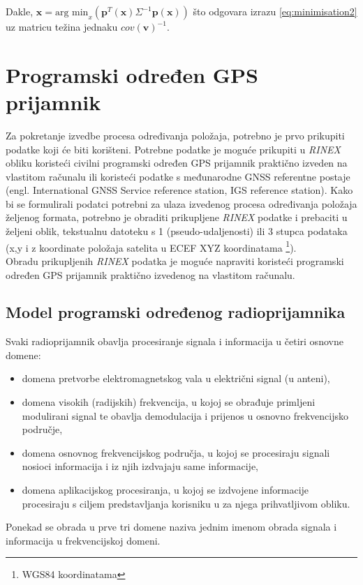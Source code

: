 \documentclass[a4paper,twoside,12pt]{memoir} %
\begin{document}
Dakle, $\hat{\mathbf{x}} = \text{arg min}_x \left( \mathbf{p}^T (\mathbf{x}) \Sigma^{-1}\mathbf{p} (\mathbf{x}) \right)$ 
što odgovara izrazu \ref{eq:minimisation2} uz matricu težina jednaku $cov(\mathbf{v})^{-1}$.

\chapter{Programski određen GPS prijamnik}
Za pokretanje izvedbe procesa određivanja položaja, potrebno je prvo prikupiti podatke koji će biti korišteni. Potrebne podatke je moguće prikupiti u \textit{RINEX} obliku 
koristeći civilni programski određen GPS prijamnik praktično izveden na vlastitom računalu ili 
koristeći podatke s međunarodne GNSS referentne postaje (engl. International GNSS Service reference station, IGS reference station).
Kako bi se formulirali podatci potrebni za ulaza izvedenog procesa određivanja položaja
željenog formata, potrebno je obraditi prikupljene \textit{RINEX} podatke i prebaciti u željeni oblik, tekstualnu datoteku s 1 (pseudo-udaljenosti) ili 3 stupca podataka (x,y i z koordinate položaja satelita u ECEF XYZ koordinatama \footnote{WGS84 koordinatama}).\\
Obradu prikupljenih \textit{RINEX} podatka je moguće napraviti koristeći
programski određen GPS prijamnik praktično izvedenog na vlastitom računalu.

\section{Model programski određenog radioprijamnika}
Svaki radioprijamnik obavlja procesiranje signala i informacija u četiri osnovne domene:
\begin{itemize}
	\item domena pretvorbe elektromagnetskog vala u električni signal (u anteni),
	\item domena visokih (radijskih) frekvencija, u kojoj se obrađuje primljeni modulirani signal te obavlja demodulacija i prijenos u osnovno frekvencijsko područje,
	\item domena osnovnog frekvencijskog područja, u kojoj se procesiraju signali nosioci informacija i iz njih izdvajaju same informacije,
	\item domena aplikacijskog procesiranja, u kojoj se izdvojene informacije procesiraju s ciljem predstavljanja korisniku u za njega prihvatljivom obliku.
\end{itemize} 
Ponekad se obrada u prve tri domene naziva jednim imenom obrada signala i informacija u frekvencijskoj domeni.
\end{document}
